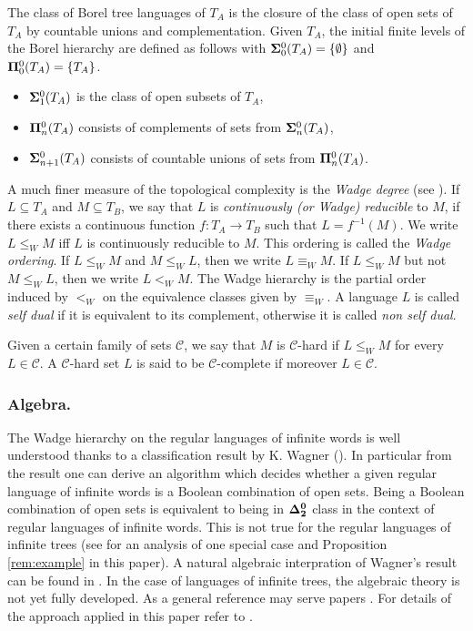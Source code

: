 The class of Borel tree languages of $T_A$ is the
closure of the class of open sets of $T_A$ by countable unions and
complementation. Given $T_A$, the initial finite levels of the
Borel hierarchy are defined as follows with ${\bf\Sigma}^0_0(T_A)= \{\emptyset\}$ and
${\bf\Pi}^0_0(T_A)=\{T_A \}$.
\begin{itemize}
\item ${\bf\Sigma}^0_1(T_A)$ is the class of open subsets of $T_A$, 
\item ${\bf\Pi}^0_n(T_A)$ consists of complements of sets from ${\bf\Sigma}^0_n(T_A)$, 
\item ${\bf\Sigma}^0_{n+1}(T_A)$ consists of countable unions of sets from ${\bf\Pi}^0_n(T_A)$. 
\end{itemize}

A much finer measure of the topological complexity is the \emph{Wadge degree} (see \cite[Chapter 21.E]{kechris}).
If $L \subseteq T_A$ and $M\subseteq T_B$, we say that $L$ is \emph{continuously (or Wadge)
reducible} to $M$, if there exists a continuous function $f: T_A \to T_B$ such that $L=
f^{-1}(M)$. We write $L \leq_W M$ iff $L$ is continuously reducible to $M$.
This ordering is called the {\em Wadge ordering}. If $L \leq_W M$ and $M \leq_W L$, then we write $L
\equiv_W M$. If $L \leq_W M$ but not $M \leq_W L$, then we write $L<_W
M$. The Wadge hierarchy is the partial order induced by $<_W$ on the
equivalence classes given by $\equiv_W$. A language  $L$ is called {\em self dual} if it is equivalent 
to its complement, otherwise it is called {\em non self dual}.

Given a certain family of sets $\mathcal{C}$, we say that $M$ is $\mathcal{C}$-hard if $L
\leq_W M$ for every $L \in \mathcal{C}$. A    $\mathcal{C}$-hard set $L$ is said to be $\mathcal{C}$-complete if 
moreover $L \in \mathcal{C}$.

\subsubsection*{Algebra.}
The Wadge hierarchy on the regular languages of infinite words is well understood thanks to a classification result by K. Wagner (\cite{wagner}). In particular from the result one can derive an algorithm which decides whether a given regular language of infinite words is a Boolean combination of open sets. Being a Boolean combination of open sets is equivalent to being in ${\bf \Delta^0_2}$ class in the context of regular languages of infinite words. This is not true for the regular languages of infinite trees (see \cite[Section 4.1]{bp} for an analysis of one special case and Proposition \ref{rem:example} in this paper).   
A natural algebraic interpration of Wagner's result can be found in \cite[Theorem V.6.2]{pinperrin}. In the case of languages of infinite trees, the algebraic theory is not yet fully developed. As a general reference may serve papers \cite{blumensath,bp,bojtrees,bojidziaszek}. For details of the approach applied in this paper refer to \cite[Section 3]{bp}. 

